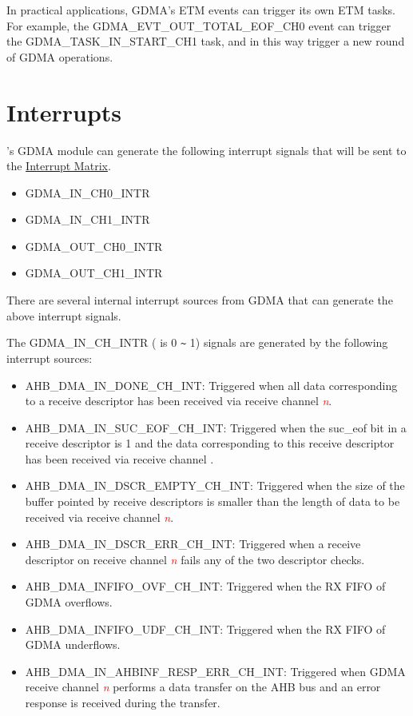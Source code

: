 \documentclass[main\_\_EN.tex]{subfiles}
\begin{document}
In practical applications, GDMA's ETM events can trigger its own ETM tasks. For example, the GDMA\_EVT\_OUT\_TOTAL\_EOF\_CH0 event can trigger the GDMA\_TASK\_IN\_START\_CH1 task, and in this way trigger a new round of GDMA operations.

\section{Interrupts}

\chipname{}'s GDMA module can generate the following interrupt signals that will be sent to the \hyperref[mod:intmtrx]{Interrupt Matrix}.

    \begin{itemize}
        \item GDMA\_IN\_CH0\_INTR
        \item GDMA\_IN\_CH1\_INTR
        \item GDMA\_OUT\_CH0\_INTR
        \item GDMA\_OUT\_CH1\_INTR
    \end{itemize}

There are several internal interrupt sources from GDMA that can generate the above interrupt signals.

The GDMA\_IN\_CH\_INTR ( is 0 \verb+~+ 1) signals are generated by the following interrupt sources:

\begin{itemize}
    \item \label{int:GDMAINDONEINT}AHB\_DMA\_IN\_DONE\_CH\_INT: Triggered when all data corresponding to a receive descriptor has been received via receive channel \textcolor{red}{\it{n}}.
    \item \label{int:GDMAINSUCEOFINT}AHB\_DMA\_IN\_SUC\_EOF\_CH\_INT: Triggered when the suc\_eof bit in a receive descriptor is 1 and the data corresponding to this receive descriptor has been received via receive channel .
    \item \label{int:GDMAINDSCREMPTYINT}AHB\_DMA\_IN\_DSCR\_EMPTY\_CH\_INT: Triggered when the size of the buffer pointed by receive descriptors is smaller than the length of data to be received via receive channel \textcolor{red}{\it{n}}.
    \item \label{int:GDMAINDSCRERRINT}AHB\_DMA\_IN\_DSCR\_ERR\_CH\_INT: Triggered when a receive descriptor on receive channel \textcolor{red}{\it{n}} fails any of the two descriptor checks.
    \item \label{int:GDMAINFIFOOVFINT}AHB\_DMA\_INFIFO\_OVF\_CH\_INT: Triggered when the RX FIFO of GDMA overflows.
    \item \label{int:GDMAINFIFOUDFINT}AHB\_DMA\_INFIFO\_UDF\_CH\_INT: Triggered when the  RX FIFO of GDMA underflows.
    \item \label{int:GDMAINAHBINFRESPERRINT}AHB\_DMA\_IN\_AHBINF\_RESP\_ERR\_CH\_INT: Triggered when GDMA receive channel \textcolor{red}{\it{n}} performs a data transfer on the AHB bus and an error response is received during the transfer.
\end{itemize}
\end{document}
